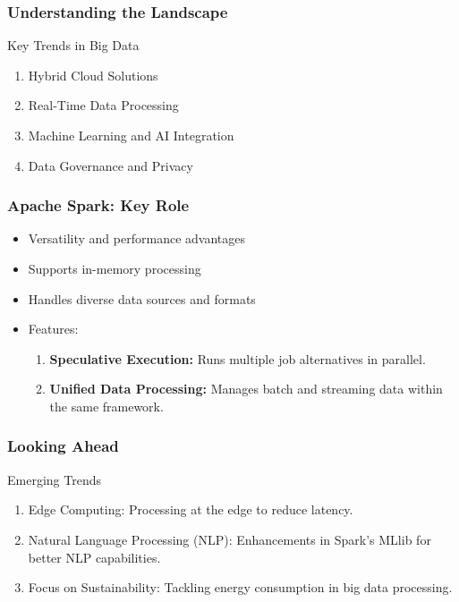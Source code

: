 \documentclass[aspectratio=169]{beamer}
\begin{document}
\begin{frame}[fragile]
  \frametitle{Understanding the Landscape}
  \begin{block}{Key Trends in Big Data}
    \begin{enumerate}
      \item Hybrid Cloud Solutions
      \item Real-Time Data Processing
      \item Machine Learning and AI Integration
      \item Data Governance and Privacy
    \end{enumerate}
  \end{block}
\end{frame}

\begin{frame}[fragile]
  \frametitle{Apache Spark: Key Role}
  \begin{itemize}
    \item Versatility and performance advantages
    \item Supports in-memory processing
    \item Handles diverse data sources and formats
    \item Features:
      \begin{enumerate}
        \item \textbf{Speculative Execution:} Runs multiple job alternatives in parallel.
        \item \textbf{Unified Data Processing:} Manages batch and streaming data within the same framework.
      \end{enumerate}
  \end{itemize}
\end{frame}

\begin{frame}[fragile]
  \frametitle{Looking Ahead}
  \begin{block}{Emerging Trends}
    \begin{enumerate}
      \item Edge Computing: Processing at the edge to reduce latency.
      \item Natural Language Processing (NLP): Enhancements in Spark’s MLlib for better NLP capabilities.
      \item Focus on Sustainability: Tackling energy consumption in big data processing.
    \end{enumerate}
  \end{block}
\end{frame}
\end{document}
